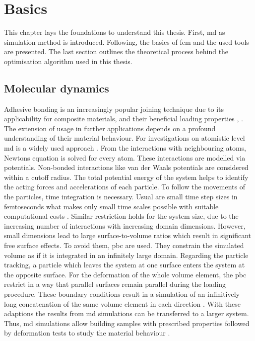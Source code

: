 




\chapter{Basics} \label{chap: basics}
This chapter lays the foundations to understand this thesis. First, \acrfull{md} as simulation method is introduced. Following, the basics of \acrshort{fem} and the used tools are presented. The last section outlines the theoretical process behind the optimisation algorithm used in this thesis.

\section{Molecular dynamics} \label{sec: MDBasics}
Adhesive bonding is an increasingly popular joining technique due to its applicability for composite materials, and their beneficial loading properties \cite{campilho_extended_2011}, \cite{pramanik_joining_2017}. The extension of usage in further applications depends on a profound understanding of their material behaviour. For investigations on atomistic level \acrfull{md} is a widely used approach  \cite{ries_mechanical_2024}. From the interactions with neighbouring atoms, Newtons equation is solved for every atom. These interactions are modelled via potentials. Non-bonded interactions like van der Waals potentials are considered within a cutoff radius. The total potential energy of the system helps to identify the acting forces and accelerations of each particle. To follow the movements of the particles, time integration is necessary. Usual are small time step sizes in femtoseconds what makes only small time scales possible with suitable computational costs \cite{ries_mechanical_2024}. Similar restriction holds for the system size, due to the increasing number of interactions with increasing domain dimensions. However, small dimensions lead to large surface-to-volume ratios which result in significant free surface effects. To avoid them, \acrfull{pbc} are used. They constrain the simulated volume as if it is integrated in an infinitely large domain. Regarding the particle tracking, a particle which leaves the system at one surface enters the system at the opposite surface. For the deformation of the whole volume element, the \acrshort{pbc} restrict in a way that parallel surfaces remain parallel during the loading procedure. These boundary conditions result in a simulation of an infinitively long concatenation of the same volume element in each direction \cite{gorbunov_periodic_2022}.
With these adaptions the results from \acrshort{md} simulations can be transferred to a larger system. 
Thus, \acrshort{md} simulations allow building samples with prescribed properties followed by deformation tests to study the material behaviour \cite{buyukozturk_structural_2011}. 

